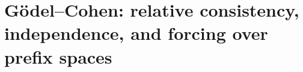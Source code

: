 \chapter{Gödel--Cohen: relative consistency, independence, and forcing over prefix spaces}
\label{chap:p3-final:55:godel_cohen}

